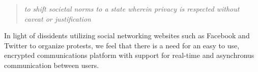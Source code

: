 \begin{quote}
\centering
\textit{to shift societal norms to a state wherein privacy is respected without
caveat or justification}
\end{quote}

In light of dissidents utilizing social networking websites such as Facebook and
Twitter to organize protests, we feel that there is a need for an easy to use,
encrypted communications platform with support for real-time and asynchronus
communication between users.
